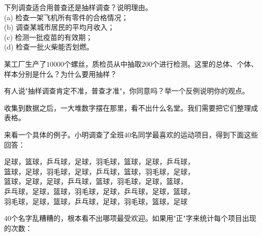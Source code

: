 \begin{center}
\end{center}

\begin{exercise}
\item 下列调查适合用普查还是抽样调查？说明理由。\\
(a) 检查一架飞机所有零件的合格情况；\\
(b) 调查某城市居民的平均月收入；\\
(c) 检测一批疫苗的有效期；\\
(d) 检查一批火柴能否划燃。
\item 某工厂生产了$10000$个螺丝，质检员从中抽取$200$个进行检测。这里的总体、个体、样本分别是什么？为什么要用抽样？
\item 有人说"抽样调查肯定不准，普查才准"，你同意吗？举一个反例说明你的观点。
\end{exercise}


收集到数据之后，一大堆数字摆在那里，看不出什么名堂。我们需要把它们整理成表格。

来看一个具体的例子。小明调查了全班$40$名同学最喜欢的运动项目，得到下面这些回答：

\begin{center}
足球，篮球，乒乓球，足球，羽毛球，篮球，足球，乒乓球，\\
篮球，足球，羽毛球，足球，乒乓球，篮球，羽毛球，足球，\\
篮球，足球，足球，乒乓球，篮球，羽毛球，足球，篮球，\\
乒乓球，足球，篮球，羽毛球，足球，乒乓球，足球，篮球，\\
羽毛球，足球，篮球，乒乓球，足球，羽毛球，篮球，足球
\end{center}

$40$个名字乱糟糟的，根本看不出哪项最受欢迎。如果用"正"字来统计每个项目出现的次数：


